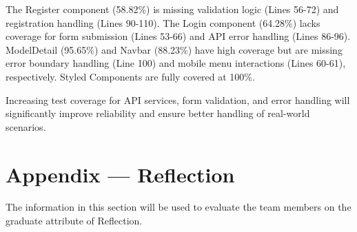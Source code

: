 \documentclass[12pt, titlepage]{article}
\begin{document}
The Register component (58.82\%) is missing validation logic (Lines 56-72) and registration handling (Lines 90-110). The Login component (64.28\%) lacks coverage for form submission (Lines 53-66) and API error handling (Lines 86-96). ModelDetail (95.65\%) and Navbar (88.23\%) have high coverage but are missing error boundary handling (Line 100) and mobile menu interactions (Lines 60-61), respectively. Styled Components are fully covered at 100\%.

Increasing test coverage for API services, form validation, and error handling will significantly improve reliability and ensure better handling of real-world scenarios.





\newpage{}



\section*{Appendix --- Reflection}

The information in this section will be used to evaluate the team members on the
graduate attribute of Reflection.


\end{document}
